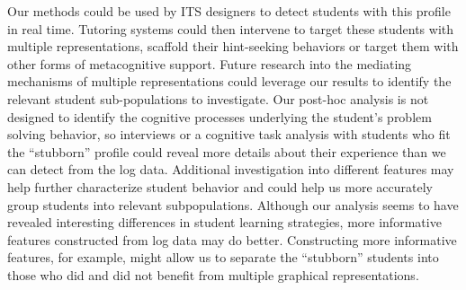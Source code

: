\documentclass{edm_template}
\begin{document}
Our methods could be used by ITS designers to detect students with this profile in real time. Tutoring systems could then intervene to target these students with multiple representations, scaffold their hint-seeking behaviors or target them with other forms of metacognitive support. Future research into  the mediating mechanisms of multiple representations could leverage our results to identify the relevant student sub-populations to investigate. Our post-hoc analysis is not designed to identify the cognitive processes underlying the student's problem solving behavior, so interviews or a cognitive task analysis with students who fit the ``stubborn'' profile could reveal more details about their experience than we can detect from the log data. Additional investigation into different features may help further characterize student behavior and could help us more accurately group students into relevant subpopulations. Although our analysis seems to have revealed interesting differences in student learning strategies, more informative features constructed from log data may do better. Constructing more informative features, for example, might allow us to separate the ``stubborn'' students into those who did and did not benefit from multiple graphical representations. 




\balancecolumns
\end{document}

